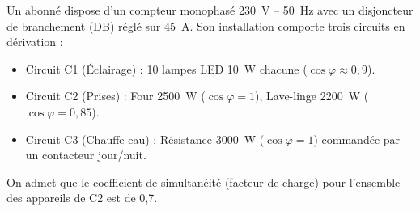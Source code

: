 \documentclass[11pt]{article}
\begin{document}
\begin{exercice}
Un abonné dispose d'un compteur monophasé \SI{230}{V} -- \SI{50}{Hz} avec un disjoncteur de branchement (DB) réglé sur \SI{45}{A}. Son installation comporte trois circuits en dérivation :
\begin{itemize}
\item Circuit C1 (Éclairage) : 10 lampes LED \SI{10}{W} chacune ($\cos\varphi \approx 0,9$).
\item Circuit C2 (Prises) : Four \SI{2500}{W} ($\cos\varphi = 1$), Lave-linge \SI{2200}{W} ($\cos\varphi = 0,85$).
\item Circuit C3 (Chauffe-eau) : Résistance \SI{3000}{W} ($\cos\varphi = 1$) commandée par un contacteur jour/nuit.
\end{itemize}
On admet que le coefficient de simultanéité (facteur de charge) pour l'ensemble des appareils de C2 est de 0,7.


\end{exercice}
\end{document}
